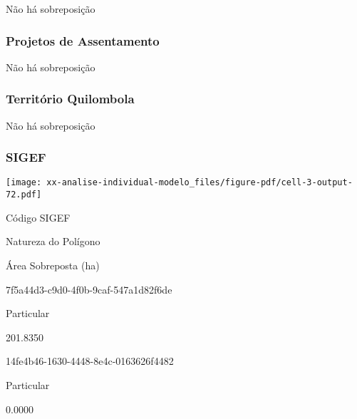 \documentclass[
  11pt,
  a4paper,
  DIV=11,
  numbers=noendperiod]{scrartcl}
\begin{document}
Não há sobreposição

\subsubsection{Projetos de
Assentamento}\label{projetos-de-assentamento-3}

Não há sobreposição

\subsubsection{Território Quilombola}\label{territuxf3rio-quilombola-3}

Não há sobreposição

\subsubsection{SIGEF}\label{sigef-3}

\texttt{[image: xx-analise-individual-modelo\_files/figure-pdf/cell-3-output-72.pdf]}

\n  

\n    

\n      

Código SIGEF

\n      

Natureza do Polígono

\n      

Área Sobreposta (ha)

\n    

\n  

\n  

\n    

\n      

7f5a44d3-c9d0-4f0b-9caf-547a1d82f6de

\n      

Particular

\n      

201.8350

\n    

\n    

\n      

14fe4b46-1630-4448-8e4c-0163626f4482

\n      

Particular

\n      

0.0000

\n    

\n    

\n      
\end{document}
